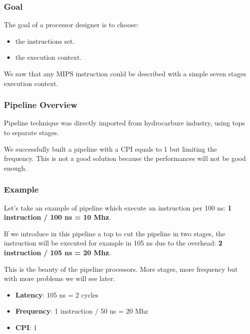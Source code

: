 
\begin{frame}
  \frametitle{Goal}

  The goal of a processor designer is to choose:

  \begin{itemize}[<+->]
    \item
      the instructions set.
    \item
      the execution context.
  \end{itemize}

  \nl

  We saw that any MIPS instruction could be described with a simple
  seven stages execution context.
\end{frame}


\begin{frame}
  \frametitle{Pipeline Overview}

  Pipeline technique was directly imported from hydrocarbure industry,
  using tops to separate stages.

  \begin{center}
  \end{center}

  \nl

  We successfully built a pipeline with a CPI equals to 1 but
  limiting the frequency. This is not a good solution because the
  performances will not be good enough.
\end{frame}


\begin{frame}
  \frametitle{Example}

  Let's take an example of pipeline which execute an instruction per 100 ns:
  \textbf{1 instruction / 100 ns = 10 Mhz}.

  \nl

  If we introduce in this pipeline a top to cut the pipeline in two stages,
  the instruction will be executed for example in 105 ns due to the overhead:
  \textbf{2 instruction / 105 ns = 20 Mhz}.

  \nl

  This is the beauty of the pipeline processors. More stages, more frequency
  but with more problems we will see later.

  \begin{itemize}
    \item
      \textbf{Latency}: 105 ns = 2 cycles
    \item
      \textbf{Frequency}: 1 instruction / 50 ns = 20 Mhz
    \item
      \textbf{CPI}: 1
  \end{itemize}

\end{frame}

